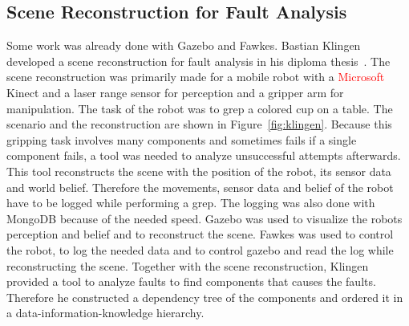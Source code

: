 \subsection{Scene Reconstruction for Fault Analysis}
Some work was already done with Gazebo and Fawkes. Bastian Klingen developed a scene reconstruction for fault analysis in his diploma thesis~\cite{KlingenDA}. The scene reconstruction was primarily made for a mobile robot with a \textcolor{red}{Microsoft} Kinect and a laser range sensor for perception and a gripper arm for manipulation. The task of the robot was to grep a colored cup on a table. The scenario and the reconstruction are shown in Figure~\ref{fig:klingen}. Because this gripping task involves many components and sometimes fails if a single component fails, a tool was needed to analyze unsuccessful attempts afterwards. This tool reconstructs the scene with the position of the robot, its sensor data and world belief. Therefore the movements, sensor data and belief of the robot have to be logged while performing a grep. The logging was also done with MongoDB because of the needed speed. Gazebo was used to visualize the robots perception and belief and to reconstruct the scene. Fawkes was used to control the robot, to log the needed data and to control gazebo and read the log while reconstructing the scene. Together with the scene reconstruction, Klingen provided a tool to analyze faults to find components that causes the faults. Therefore he constructed a dependency tree of the components and ordered it in a data-information-knowledge hierarchy.\\

